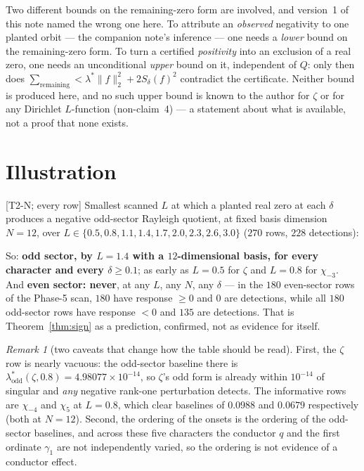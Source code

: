 \documentclass[11pt,a4paper]{article}
\theoremstyle{remark}
\newtheorem{remark}[theorem]{Remark}
\newcommand{\tier}[1]{{\small\textsf{[#1]}}}
\newcommand{\Sd}{S_\delta}
\begin{document}
Two different bounds on the remaining-zero form are involved, and version~1 of this note
named the wrong one here. To attribute an \emph{observed} negativity to one planted orbit ---
the companion note's inference --- one needs a \emph{lower} bound on the remaining-zero form.
To turn a certified \emph{positivity} into an exclusion of a real zero, one needs an
unconditional \emph{upper} bound on it, independent of $Q$: only then does
$\sum_{\text{remaining}}<\lambda^*\|f\|_2^2+2\Sd(f)^2$ contradict the certificate. Neither
bound is produced here, and no such upper bound is known to the author for $\zeta$ or for any
Dirichlet $L$-function (non-claim~4) --- a statement about what is available, not a proof
that none exists.

\section{Illustration}\label{sec:illus}

\tier{T2-N; every row} Smallest scanned $L$ at which a planted real zero at each $\delta$
produces a negative odd-sector Rayleigh quotient, at fixed basis dimension $N=12$, over
$L\in\{0.5,0.8,1.1,1.4,1.7,2.0,2.3,2.6,3.0\}$ ($270$ rows, $228$ detections):



\noindent So: \textbf{odd sector, by $L=1.4$ with a $12$-dimensional basis, for every
character and every $\delta\ge0.1$}; as early as $L=0.5$ for $\zeta$ and $L=0.8$ for
$\chi_{-3}$. And \textbf{even sector: never}, at any $L$, any $N$, any $\delta$ --- in the
$180$ even-sector rows of the Phase-5 scan, $180$ have response $\ge0$ and $0$ are
detections, while all $180$ odd-sector rows have response $<0$ and $135$ are detections.
That is Theorem~\ref{thm:sign} as a prediction, confirmed, not as evidence for itself.

\begin{remark}[two caveats that change how the table should be read]
First, the $\zeta$ row is nearly vacuous: the odd-sector baseline there is
$\lambda^*_{\mathrm{odd}}(\zeta,0.8)=4.98077\times10^{-14}$, so $\zeta$'s odd form is
already within $10^{-14}$ of singular and \emph{any} negative rank-one perturbation
detects. The informative rows are $\chi_{-4}$ and $\chi_5$ at $L=0.8$, which clear
baselines of $0.0988$ and $0.0679$ respectively (both at $N=12$). Second, the ordering of the onsets is the
ordering of the odd-sector baselines, and across these five characters the conductor $q$ and
the first ordinate $\gamma_1$ are not independently varied, so the ordering is not evidence
of a conductor effect.
\end{remark}
\end{document}
